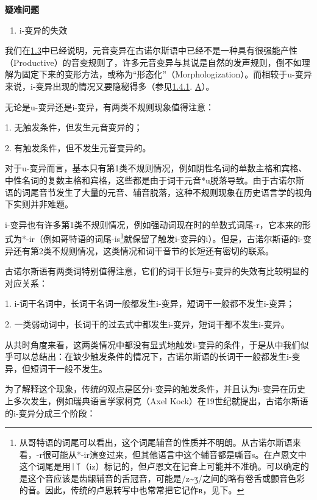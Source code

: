 \textbf{疑难问题}

\begin{enumerate}
\def\labelenumi{\arabic{enumi})}
\item
  i-变异的失效
\end{enumerate}

我们在\hyperref[ux53d8ux5143ux97f3]{1.3}中已经说明，元音变异在古诺尔斯语中已经不是一种具有很强能产性（Productive）的音变规则了，许多元音变异与其说是自然的发声规则，倒不如理解为固定下来的变形方法，或称为``形态化''（Morphologization）。而相较于u-变异来说，i-变异出现的情况又要隐秘得多（参见\hyperref[ux5143ux97f3ux7684ux97f3ux53d8]{1.4.1}.
\hyperref[_Ref117017033]{A}）。

无论是u-变异还是i-变异，有两类不规则现象值得注意：

1. 无触发条件，但发生元音变异的；

2. 有触发条件，但不发生元音变异的。

对于u-变异而言，基本只有第1类不规则情况，例如阴性名词的单数主格和宾格、中性名词的复数主格和宾格，这些都是由于词干元音*u脱落导致。由于古诺尔斯语的词尾音节发生了大量的元音、辅音脱落，这种不规则现象在历史语言学的视角下实则并非难题。

i-变异也有许多第1类不规则情况，例如强动词现在时的单数式词尾-r，它本来的形式为*-ir（例如哥特语的词尾-is\footnote{从哥特语的词尾可以看出，这个词尾辅音的性质并不明朗。从古诺尔斯语来看，-r很可能从*-ir演变过来，但其他语言中这个辅音都是嘶音s。在卢恩文中这个词尾是用ᛁᛉ（iz）标记的，但卢恩文在记音上可能并不准确。可以确定的是这个音应该是齿龈辅音的舌冠音，可能是/z\textasciitilde ʒ/之间的略有卷舌或颤音色彩的音。因此，传统的卢恩转写中也常常把它记作ʀ，见下。}就保留了触发i-变异的i）。但是，古诺尔斯语的i-变异还有第2类不规则情况，这类情况和词干音节的长短还有密切的联系。

古诺尔斯语有两类词特别值得注意，它们的词干长短与i-变异的失效有比较明显的对应关系：

1. i-词干名词中，长词干名词一般都发生i-变异，短词干一般都不发生i-变异；

2. 一类弱动词中，长词干的过去式中都发生i-变异，短词干都不发生i-变异。

从共时角度来看，这两类情况中都没有显式地触发i-变异的条件，于是从中我们似乎可以总结出：在缺少触发条件的情况下，古诺尔斯语的长词干一般都发生i-变异，但短词干一般不发生。

为了解释这个现象，传统的观点是区分i-变异的触发条件，并且认为i-变异在历史上多次发生，例如瑞典语言学家柯克（Axel
Kock）在19世纪就提出，古诺尔斯语的i-变异分成三个阶段：

